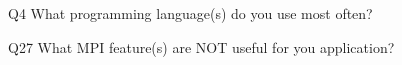 \begin{description}%
\item{Q4} What programming language(s) do you use most often?%
\item{Q27} What MPI feature(s) are NOT useful for you application?%
\end{description}%
